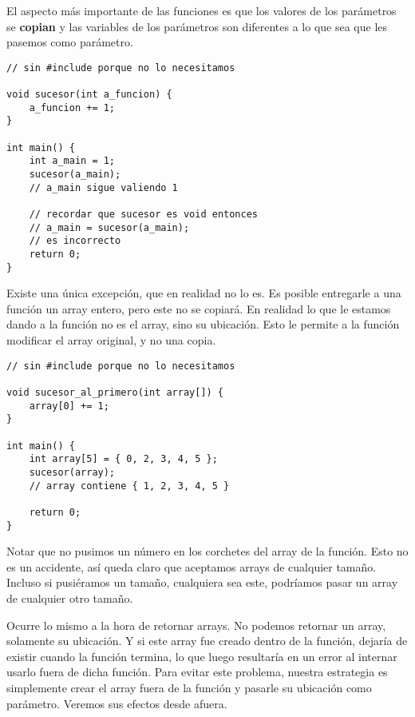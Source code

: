 \documentclass[10pt]{article}
\begin{document}
\bigskip

El aspecto más importante de las funciones es que los valores de los parámetros se \textbf{copian} y las variables de los parámetros son diferentes a lo que sea que les pasemos como parámetro.

\begin{lstlisting}
// sin #include porque no lo necesitamos

void sucesor(int a_funcion) {
	a_funcion += 1;
}

int main() {
	int a_main = 1;
	sucesor(a_main);
	// a_main sigue valiendo 1
	
	// recordar que sucesor es void entonces
	// a_main = sucesor(a_main);
	// es incorrecto
	return 0;
}
\end{lstlisting}

Existe una única excepción, que en realidad no lo es. Es posible entregarle a una función un array entero, pero este no se copiará. En realidad lo que le estamos dando a la función no es el array, sino su ubicación. Esto le permite a la función modificar el array original, y no una copia.

\begin{lstlisting}
// sin #include porque no lo necesitamos

void sucesor_al_primero(int array[]) {
	array[0] += 1;
}

int main() {
	int array[5] = { 0, 2, 3, 4, 5 };
	sucesor(array);
	// array contiene { 1, 2, 3, 4, 5 }
	
	return 0;
}
\end{lstlisting}

Notar que no pusimos un número en los corchetes del array de la función. Esto no es un accidente, así queda claro que aceptamos arrays de cualquier tamaño. Incluso si pusiéramos un tamaño, cualquiera sea este, podríamos pasar un array de cualquier otro tamaño.


\bigskip

Ocurre lo mismo a la hora de retornar arrays. No podemos retornar un array, solamente su ubicación. Y si este array fue creado dentro de la función, dejaría de existir cuando la función termina, lo que luego resultaría en un error al internar usarlo fuera de dicha función. Para evitar este problema, nuestra estrategia es simplemente crear el array fuera de la función y pasarle su ubicación como parámetro. Veremos sus efectos desde afuera.
\end{document}
